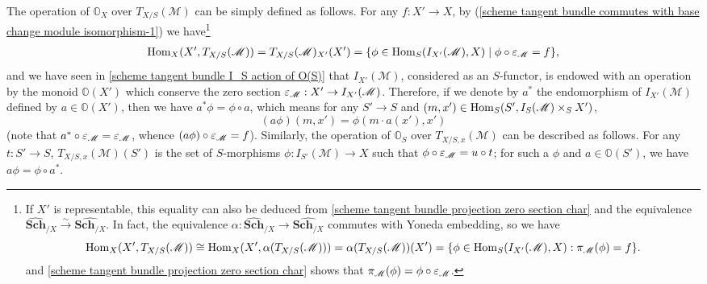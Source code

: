 \begin{remark}\label{scheme trangent bundle operation of O_X define as morphism}
The operation of $\mathbb{O}_X$ over $T_{X/S}(\mathscr{M})$ can be simply defined as follows. For any $f:X'\to X$, by (\ref{scheme tangent bundle commutes with base change module isomorphism-1}) we have\footnote{If $X'$ is representable, this equality can also be deduced from \cref{scheme tangent bundle projection zero section char} and the equivalence $\widehat{\mathbf{Sch}}_{/X}\stackrel{\sim}{\to}\widehat{\mathbf{Sch}_{/X}}$. In fact, the equivalence $\alpha:\widehat{\mathbf{Sch}}_{/X}\to\widehat{\mathbf{Sch}_{/X}}$ commutes with Yoneda embedding, so we have
\[\mathrm{Hom}_X(X',T_{X/S}(\mathscr{M}))\cong\mathrm{Hom}_{X}(X',\alpha(T_{X/S}(\mathscr{M})))=\alpha(T_{X/S}(\mathscr{M}))(X')=\{\phi\in\mathrm{Hom}_S(I_{X'}(\mathscr{M}),X):\pi_{\mathscr{M}}(\phi)=f\}.\]
and \cref{scheme tangent bundle projection zero section char} shows that $\pi_\mathscr{M}(\phi)=\phi\circ\varepsilon_\mathscr{M}$.}
\begin{align*}
\mathrm{Hom}_X(X',T_{X/S}(\mathscr{M}))=T_{X/S}(\mathscr{M})_{X'}(X')=\{\phi\in\mathrm{Hom}_S(I_{X'}(\mathscr{M}),X)\mid\phi\circ\varepsilon_\mathscr{M}=f\},
\end{align*}
and we have seen in \cref{scheme tangent bundle I_S action of O(S)} that $I_{X'}(\mathscr{M})$, considered as an $S$-functor, is endowed with an operation by the monoid $\mathbb{O}(X')$ which conserve the zero section $\varepsilon_\mathscr{M}:X'\to I_{X'}(\mathscr{M})$. Therefore, if we denote by $a^*$ the endomorphism of $I_{X'}(\mathscr{M})$ defined by $a\in\mathbb{O}(X')$, then we have $a^*\phi=\phi\circ a$, which means for any $S'\to S$ and $(m,x')\in\mathrm{Hom}_S(S',I_S(\mathscr{M})\times_SX')$,
\[(a\phi)(m,x')=\phi(m\cdot a(x'),x')\]
(note that $a^*\circ\varepsilon_\mathscr{M}=\varepsilon_\mathscr{M}$, whence $(a\phi)\circ\varepsilon_\mathscr{M}=f$). Similarly, the operation of $\mathbb{O}_S$ over $T_{X/S,x}(\mathscr{M})$ can be described as follows. For any $t:S'\to S$, $T_{X/S,x}(\mathscr{M})(S')$ is the set of $S$-morphisms $\phi:I_{S'}(\mathscr{M})\to X$ such that $\phi\circ\varepsilon_\mathscr{M}=u\circ t$; for such a $\phi$ and $a\in\mathbb{O}(S')$, we have $a\phi=\phi\circ a^*$.
\end{remark}

